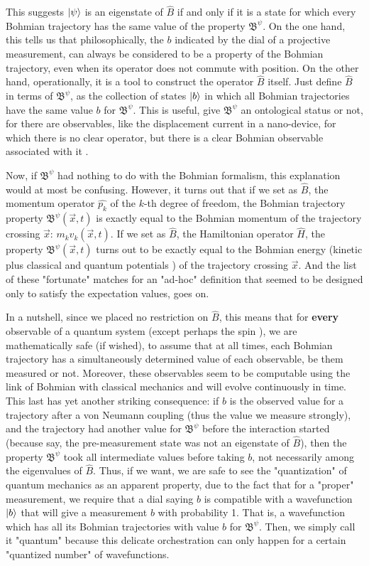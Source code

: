 \documentclass[11pt, a4paper]{article} %
\newcommand{\B}{\mathfrak{B}}
\begin{document}
This suggests $\ket{\psi}$ is an eigenstate of $\hat{B}$ if and only if it is a state for which every Bohmian trajectory has the same value of the property $\B^\psi$. On the one hand, this tells us that philosophically, the $b$ indicated by the dial of a projective measurement, can always be considered to be a property of the Bohmian trajectory, even when its operator does not commute with position. On the other hand, operationally, it is a tool to construct the operator $\hat{B}$ itself. Just define $\hat{B}$ in terms of $\B^\psi$, as the collection of states $\ket{b}$ in which all Bohmian trajectories have the same value $b$ for $\B^\psi$. This is useful, give $\B^\psi$ an ontological status or not, for there are observables, like the displacement current in a nano-device, for which there is no clear operator, but there is a clear Bohmian observable associated with it \cite{Pel, equiv}.

Now, if $\B^\psi$ had nothing to do with the Bohmian formalism, this explanation would at most be confusing. However, it turns out \cite{DevInPosition1} that if we set as $\hat{B}$, the momentum operator $\hat{p_k}$ of the $k$-th degree of freedom, the Bohmian trajectory property $\B^\psi(\vec{x},t)$ is exactly equal to the Bohmian momentum of the trajectory crossing $\vec{x}$: $m_k v_k(\vec{x},t)$. If we set as $\hat{B}$, the Hamiltonian operator $\hat{H}$, the property $\B^\psi(\vec{x},t)$ turns out to be exactly equal to the Bohmian energy (kinetic plus classical and quantum potentials \cite{JordiXavier}) of the trajectory crossing $\vec{x}$. And the list of these "fortunate" matches for an "ad-hoc" definition that seemed to be designed only to satisfy the expectation values, goes on. 

In a nutshell, since we placed no restriction on $\hat{B}$, this means that for {\bf every} observable of a quantum system (except perhaps the spin \cite{spin}), we are mathematically safe (if wished), to assume that at all times, each Bohmian trajectory has a simultaneously determined value of each observable, be them measured or not. Moreover, these observables seem to be computable using the link of Bohmian with classical mechanics and will evolve continuously in time. This last has yet another striking consequence: if $b$ is the observed value for a trajectory after a von Neumann coupling (thus the value we measure strongly), and the trajectory had another value for $\B^\psi$ before the interaction started (because say, the pre-measurement state was not an eigenstate of $\hat{B}$), then the property $\B^\psi$ took all intermediate values before taking $b$, not necessarily among the eigenvalues of $\hat{B}$. Thus, if we want, we are safe to see the "quantization" of quantum mechanics as an apparent property, due to the fact that for a "proper" measurement, we require that a dial saying $b$ is compatible with a wavefunction $\ket{b}$ that will give a measurement $b$ with probability 1. That is, a wavefunction which has all its Bohmian trajectories with value $b$ for $\B^\psi$. Then, we simply call it "quantum" because this delicate orchestration can only happen for a certain "quantized number" of wavefunctions.
\end{document}
